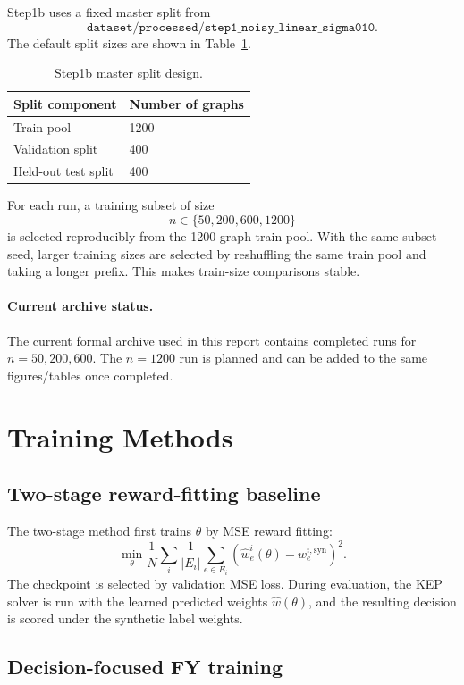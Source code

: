 Step1b uses a fixed master split from
\[
\texttt{dataset/processed/step1\_noisy\_linear\_sigma010}.
\]
The default split sizes are shown in Table~\ref{tab:step1b-split}.

\begin{table}[h]
\centering
\caption{Step1b master split design.}
\label{tab:step1b-split}
\begin{tabular}{ll}
\toprule
Split component & Number of graphs \\
\midrule
Train pool & 1200 \\
Validation split & 400 \\
Held-out test split & 400 \\
\bottomrule
\end{tabular}
\end{table}

For each run, a training subset of size
\[
    n \in \{50, 200, 600, 1200\}
\]
is selected reproducibly from the 1200-graph train pool. With the same subset
seed, larger training sizes are selected by reshuffling the same train pool and
taking a longer prefix. This makes train-size comparisons stable.

\paragraph{Current archive status.}
The current formal archive used in this report contains completed runs for
\(n=50,200,600\). The \(n=1200\) run is planned and can be added to the same
figures/tables once completed.

\section{Training Methods}

\subsection{Two-stage reward-fitting baseline}

The two-stage method first trains \(\theta\) by MSE reward fitting:
\[
    \min_{\theta}
    \frac{1}{N}\sum_i
    \frac{1}{|E_i|}
    \sum_{e\in E_i}
    \left(\hat w^i_e(\theta)-w^{i,\mathrm{syn}}_e\right)^2.
\]
The checkpoint is selected by validation MSE loss. During evaluation, the KEP
solver is run with the learned predicted weights \(\hat w(\theta)\), and the
resulting decision is scored under the synthetic label weights.

\subsection{Decision-focused FY training}


